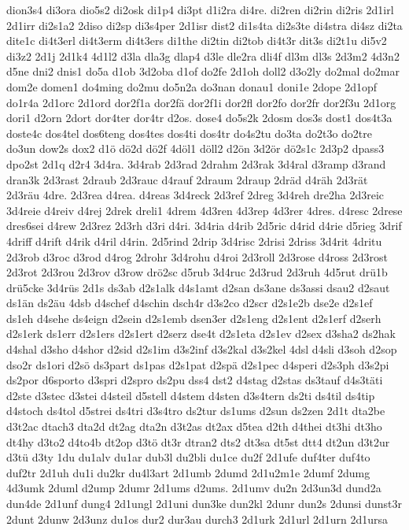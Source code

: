 {dion3s4
di3ora
dio5s2
di2osk
di1p4
di3pt
d1i2ra
di4re.
di2ren
di2rin
di2ris
2d1irl
2d1irr
di2s1a2
2diso
di2sp
di3s4per
2d1isr
dist2
di1s4ta
di2s3te
di4stra
di4sz
di2ta
dite1c
di4t3erl
di4t3erm
di4t3ers
di1the
di2tin
di2tob
di4t3r
dit3s
di2t1u
di5v2
di3z2
2d1j
2d1k4
4d1l2
d3la
dla3g
dlap4
d3le
dle2ra
dli4f
dl3m
dl3s
2d3m2
4d3n2
d5ne
dni2
dnis1
do5a
d1ob
3d2oba
d1of
do2fe
2d1oh
doll2
d3o2ly
do2mal
do2mar
dom2e
domen1
do4ming
do2mu
do5n2a
do3nan
donau1
doni1e
2dope
2d1opf
do1r4a
2d1orc
2d1ord
dor2f1a
dor2fä
dor2f1i
dor2fl
dor2fo
dor2fr
dor2f3u
2d1org
dori1
d2orn
2dort
dor4ter
dor4tr
d2os.
dose4
do5s2k
2dosm
dos3s
dost1
dos4t3a
doste4c
dos4tel
dos6teng
dos4tes
dos4ti
dos4tr
do4s2tu
do3ta
do2t3o
do2tre
do3un
dow2s
dox2
d1ö
dö2d
dö2f
4döl1
döll2
d2ön
3d2ör
dö2s1c
2d3p2
dpass3
dpo2st
2d1q
d2r4
3d4ra.
3d4rab
2d3rad
2drahm
2d3rak
3d4ral
d3ramp
d3rand
dran3k
2d3rast
2draub
2d3rauc
d4rauf
2draum
2draup
2dräd
d4räh
2d3rät
2d3räu
4dre.
2d3rea
d4rea.
d4reas
3d4reck
2d3ref
2dreg
3d4reh
dre2ha
2d3reic
3d4reie
d4reiv
d4rej
2drek
dreli1
4drem
4d3ren
4d3rep
4d3rer
4dres.
d4resc
2drese
dres6sei
d4rew
2d3rez
2d3rh
d3ri
d4ri.
3d4ria
d4rib
2d5ric
d4rid
d4rie
d5rieg
3drif
4driff
d4rift
d4rik
d4ril
d4rin.
2d5rind
2drip
3d4risc
2drisi
2driss
3d4rit
4dritu
2d3rob
d3roc
d3rod
d4rog
2drohr
3d4rohu
d4roi
2d3roll
2d3rose
d4ross
2d3rost
2d3rot
2d3rou
2d3rov
d3row
drö2sc
d5rub
3d4ruc
2d3rud
2d3ruh
4d5rut
drü1b
drü5cke
3d4rüs
2d1s
ds3ab
d2s1alk
d4s1amt
d2san
ds3ane
ds3assi
dsau2
d2saut
ds1än
ds2äu
4dsb
d4schef
d4schin
dsch4r
d3s2co
d2scr
d2s1e2b
dse2e
d2s1ef
ds1eh
d4sehe
ds4eign
d2sein
d2s1emb
dsen3er
d2s1eng
d2s1ent
d2s1erf
d2serh
d2s1erk
ds1err
d2s1ers
d2s1ert
d2serz
dse4t
d2s1eta
d2s1ev
d2sex
d3sha2
ds2hak
d4shal
d3sho
d4shor
d2sid
d2s1im
d3s2inf
d3s2kal
d3s2kel
4dsl
d4sli
d3soh
d2sop
dso2r
ds1ori
d2sö
ds3part
ds1pas
d2s1pat
d2spä
d2s1pec
d4speri
d2s3ph
d3s2pi
ds2por
d6sporto
d3spri
d2spro
ds2pu
dss4
dst2
d4stag
d2stas
ds3tauf
d4s3täti
d2ste
d3stec
d3stei
d4steil
d5stell
d4stem
d4sten
d3s4tern
ds2ti
ds4til
ds4tip
d4stoch
ds4tol
d5strei
ds4tri
d3s4tro
ds2tur
ds1ums
d2sun
ds2zen
2d1t
dta2be
d3t2ac
dtach3
dta2d
dt2ag
dta2n
d3t2as
dt2ax
d5tea
d2th
d4thei
dt3hi
dt3ho
dt4hy
d3to2
d4to4b
dt2op
d3tö
dt3r
dtran2
dts2
dt3sa
dt5st
dtt4
dt2un
d3t2ur
d3tü
d3ty
1du
du1alv
du1ar
dub3l
du2bli
du1ce
du2f
2d1ufe
duf4ter
duf4to
duf2tr
2d1uh
du1i
du2kr
du4l3art
2d1umb
2dumd
2d1u2m1e
2dumf
2dumg
4d3umk
2duml
d2ump
2dumr
2d1ums
d2ums.
2d1umv
du2n
2d3un3d
dund2a
dun4de
2d1unf
dung4
2d1ungl
2d1uni
dun3ke
dun2kl
2dunr
dun2s
2dunsi
dunst3r
2dunt
2dunw
2d3unz
du1os
dur2
dur3au
durch3
2d1urk
2d1url
2d1urn
2d1ursa
}

